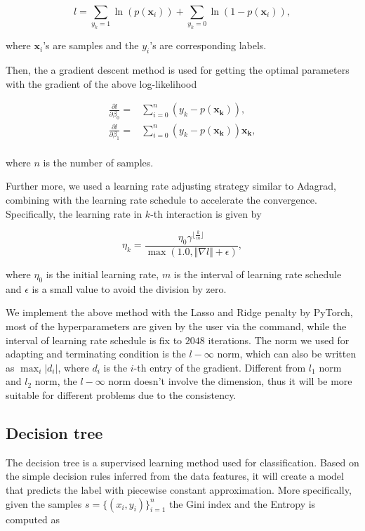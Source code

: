 \documentclass[11pt]{article}
\begin{document}
$$
  l = \sum_{y_k = 1} \ln(p (\mathbf{x}_i)) + \sum_{y_k = 0} \ln(1 - p (\mathbf{x}_i)),
$$

\noindent where $\mathbf{x}_i$'s are samples and the $y_i$'s are corresponding labels.

Then, the a gradient descent method is used for getting the optimal parameters with the gradient of the above log-likelihood

$$
  \begin{aligned}
    \frac{\partial l}{\partial \beta_0} = & \sum_{i=0}^n (y_k - p (\mathbf{x_k})),              \\
    \frac{\partial l}{\partial \beta_1} = & \sum_{i=0}^n (y_k - p (\mathbf{x_k})) \mathbf{x_k}, \\
  \end{aligned}
$$

\noindent where $n$ is the number of samples.

Further more, we used a learning rate adjusting strategy similar to Adagrad, combining with the learning rate schedule to accelerate the convergence. Specifically, the learning rate in $k$-th interaction is given by

$$
  \eta_k = \frac{\eta_0 \gamma^{\lfloor \frac{k}{m} \rfloor}}{\max(1.0, \Vert \nabla l \Vert + \epsilon)},
$$

\noindent where $\eta_0$ is the initial learning rate, $m$ is the interval of learning rate schedule and $\epsilon$ is a small value to avoid the division by zero.

We implement the above method with the Lasso and Ridge penalty by PyTorch, most of the hyperparameters are given by the user via the command, while the interval of learning rate schedule is fix to $2048$ iterations. The norm we used for adapting and terminating condition is the $l-\infty$ norm, which can also be written as $\max_{i} \vert d_i \vert$, where $d_i$ is the $i$-th entry of the gradient. Different from $l_1$ norm and $l_2$ norm, the $l-\infty$ norm doesn't involve the dimension, thus it will be more suitable for different problems due to the consistency.

\subsection{Decision tree}

The decision tree \cite{utgoff1989incremental} \cite{kotsiantis2013decision} is a supervised learning method used for classification. Based on the simple decision rules inferred from the data features, it will create a model that predicts the label with piecewise constant approximation. More specifically, given the samples $s = \{(x_i, y_i)\}_{i=1}^n$ the Gini index and the Entropy is computed as
\end{document}

